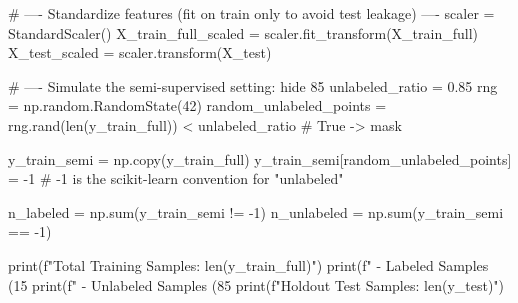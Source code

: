 \begin{codebox}[title={Suppress a known sklearn deprecation notice for SVC(probability=True)}]
# ---- Standardize features (fit on train only to avoid test leakage) ----
scaler = StandardScaler()
X_train_full_scaled = scaler.fit_transform(X_train_full)
X_test_scaled = scaler.transform(X_test)

# ---- Simulate the semi-supervised setting: hide 85%
unlabeled_ratio = 0.85
rng = np.random.RandomState(42)
random_unlabeled_points = rng.rand(len(y_train_full)) < unlabeled_ratio   # True -> mask

y_train_semi = np.copy(y_train_full)
y_train_semi[random_unlabeled_points] = -1   # -1 is the scikit-learn convention for "unlabeled"

n_labeled = np.sum(y_train_semi != -1)
n_unlabeled = np.sum(y_train_semi == -1)

print(f"Total Training Samples:   {len(y_train_full)}")
print(f" - Labeled Samples (15%
print(f" - Unlabeled Samples (85%
print(f"Holdout Test Samples:     {len(y_test)}")
\end{codebox}


